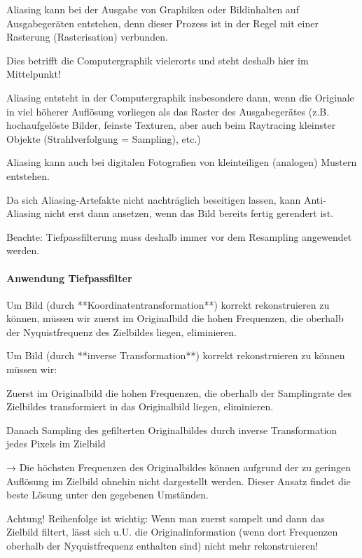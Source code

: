 \documentclass[landscape]{article}
\begin{document}
\begin{multicols}{3}
  Aliasing kann bei der Ausgabe von Graphiken oder Bildinhalten auf Ausgabegeräten entstehen, denn dieser Prozess ist in der Regel mit einer Rasterung (Rasterisation) verbunden.
  \begin{itemize*}
    \item Dies betrifft die Computergraphik vielerorts und steht deshalb hier im Mittelpunkt!
    \item Aliasing entsteht in der Computergraphik insbesondere dann, wenn die Originale in viel höherer Auflösung vorliegen als das Raster des Ausgabegerätes (z.B. hochaufgelöste Bilder, feinste Texturen, aber auch beim Raytracing kleinster Objekte (Strahlverfolgung = Sampling), etc.)
    \item Aliasing kann auch bei digitalen Fotografien von kleinteiligen (analogen) Mustern entstehen.
    \item Da sich Aliasing-Artefakte nicht nachträglich beseitigen lassen, kann Anti-Aliasing nicht erst dann ansetzen, wenn das Bild bereits fertig gerendert ist.
    \item Beachte: Tiefpassfilterung muss deshalb immer vor dem Resampling angewendet werden.
  \end{itemize*}
  
  \paragraph{Anwendung Tiefpassfilter}
  Um Bild (durch **Koordinatentransformation**) korrekt rekonstruieren zu können, müssen wir zuerst im Originalbild die hohen Frequenzen, die oberhalb der Nyquistfrequenz des Zielbildes liegen, eliminieren.
  
  Um Bild (durch **inverse Transformation**) korrekt rekonstruieren zu können müssen wir:
  \begin{itemize*}
    \item Zuerst im Originalbild die hohen Frequenzen, die oberhalb der Samplingrate des Zielbildes transformiert in das Originalbild liegen, eliminieren.
    \item Danach Sampling des gefilterten Originalbildes durch inverse Transformation jedes Pixels im Zielbild
  \end{itemize*}
  
  → Die höchsten Frequenzen des Originalbildes können aufgrund der zu geringen Auflösung im Zielbild ohnehin nicht dargestellt werden. Dieser Ansatz findet die beste Lösung unter den gegebenen Umständen. 
  
  Achtung! Reihenfolge ist wichtig: Wenn man zuerst sampelt und dann das Zielbild filtert, lässt sich u.U. die Originalinformation (wenn dort Frequenzen oberhalb der Nyquistfrequenz enthalten sind) nicht mehr rekonstruieren!
  

\end{multicols}
\end{document}
